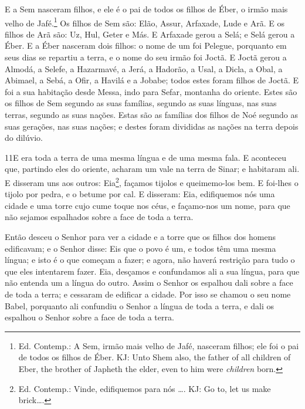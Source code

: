 E a Sem nasceram filhos, e ele é o pai de todos os filhos de
Éber, o irmão mais velho de Jafé.\footnote{Ed. Contemp.: A Sem,
irmão mais velho de Jafé, nasceram filhos; ele foi o pai de todos os
filhos de Éber. KJ: Unto Shem also, the father of all children of
Eber, the brother of Japheth the elder, even to him were
\emph{children} born.} Os filhos de Sem são: Elão, Assur,
Arfaxade, Lude e Arã. E os filhos de Arã são: Uz, Hul, Geter
e Más. E Arfaxade gerou a Selá; e Selá gerou a Éber. E
a Éber nasceram dois filhos: o nome de um foi Pelegue, porquanto em
seus dias se repartiu a terra, e o nome do seu irmão foi Joctã.
E Joctã gerou a Almodá, a Selefe, a Hazarmavé, a Jerá,
a Hadorão, a Usal, a Dicla, a Obal, a Abimael, a Sebá,
a Ofir, a Havilá e a Jobabe; todos estes foram filhos de
Joctã. E foi a sua habitação desde Messa, indo para Sefar,
montanha do oriente. Estes são os filhos de Sem segundo as
suas famílias, segundo as suas línguas, nas suas terras, segundo as
suas nações. Estas são as famílias dos filhos de Noé segundo
as suas gerações, nas suas nações; e destes foram divididas as
nações na terra depois do dilúvio.

\smallskip

\lettrine{11} E era toda a terra de uma mesma língua e de uma
mesma fala. E aconteceu que, partindo eles do oriente, acharam
um vale na terra de Sinar; e habitaram ali. E disseram uns aos
outros: Eia\footnote{Ed. Contemp.: Vinde, edifiquemos para nós
\ldots{}. KJ: Go to, let us make brick\ldots{}.}, façamos tijolos e
queimemo-los bem. E foi-lhes o tijolo por pedra, e o betume por cal.
E disseram: Eia, edifiquemos nós uma cidade e uma torre cujo
cume toque nos céus, e façamo-nos um nome, para que não sejamos
espalhados sobre a face de toda a terra.

Então desceu o Senhor para ver a cidade e a torre que os filhos
dos homens edificavam; e o Senhor disse: Eis que o povo é um, e
todos têm uma mesma língua; e isto é o que começam a fazer; e agora,
não haverá restrição para tudo o que eles intentarem fazer. Eia,
desçamos e confundamos ali a sua língua, para que não entenda um a
língua do outro. Assim o Senhor os espalhou dali sobre a face de
toda a terra; e cessaram de edificar a cidade. Por isso se
chamou o seu nome Babel, porquanto ali confundiu o Senhor a língua
de toda a terra, e dali os espalhou o Senhor sobre a face de toda a
terra.

